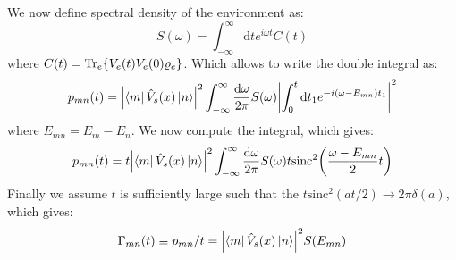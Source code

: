 \documentclass[aps,twocolumn,pra,notitlepage,]{revtex4-2}
\begin{document}
We now define spectral density of the environment as:
\begin{equation}
    S(\omega) = \int_{-\infty}^\infty \text{d}t e^{i\omega t} C(t)
\end{equation}
where $C(t) = 
\Tr_e\{V_e(t)V_e(0)\varrho_e\}$. Which allows to write the double integral as:
\begin{align}
    p_{mn}(t) = \abs{\bra{m}\hat V_s(x)\ket{n}}^2 \int_{-\infty}^\infty \frac{\text{d}\omega}{2\pi} S(\omega) \abs{\int_0^t \text{d}t_1 e^{-i(\omega - E_{mn}) t_1}}^2 \nonumber \\
\end{align} 
where $E_{mn} = E_m - E_n$. We now compute the integral, which gives:
\begin{equation}
    p_{mn}(t) = t\abs{\bra{m}\hat V_s(x)\ket{n}}^2 \int_{-\infty}^\infty \frac{\text{d}\omega}{2\pi} S(\omega) t \text{sinc}^2\bigg(\frac{\omega - E_{mn}}{2}t\bigg)
\end{equation}
Finally we assume $t$ is sufficiently large such that the $t \text{sinc}^2(a t/2) \to 2\pi \delta(a)$, which gives: 
\begin{equation}
    \Gamma_{mn}(t) \equiv p_{mn}/t =  \abs{\bra{m}\hat V_s(x)\ket{n}}^2 S(E_{mn})
\end{equation}







%
\end{document}
